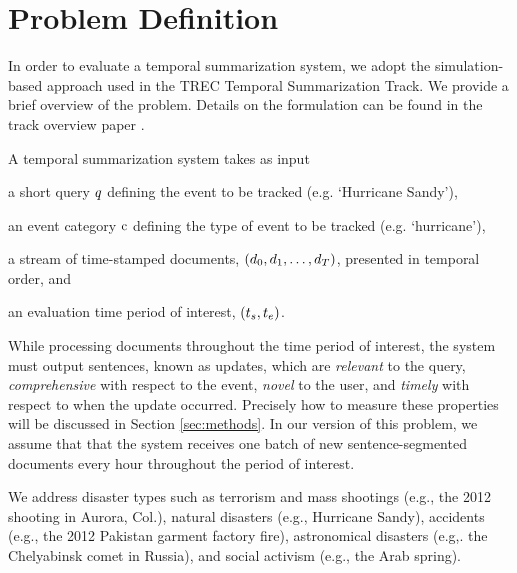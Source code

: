 \section{Problem Definition}
\label{sec:problemdefinition}
In order to evaluate a temporal summarization system, we adopt the simulation-based approach used in the TREC Temporal Summarization Track.  We provide a brief overview of the problem.  Details on the formulation can be found in the track overview paper \cite{aslam2013trec}.  

A temporal summarization system takes as input 
\begin{enumerate*}[label=\itshape\alph*\upshape)]
  \item a short query $q$ defining the event to be tracked (e.g. `Hurricane Sandy'), 
  \item an event category $\operatorname{c}$ defining the type of event to be tracked (e.g. `hurricane'), 
  \item a stream of time-stamped documents, $(\operatorname{\mathnormal{d}}_0, \operatorname{\mathnormal{d}}_1,\ldots,\operatorname{\mathnormal{d}}_T)$, presented in temporal order, and
        \item an evaluation time period of interest, $(t_s,t_e)$.  
\end{enumerate*}
While processing documents throughout the time period of interest, the system
must output sentences, known as updates, which are \emph{relevant} to the
query, \emph{comprehensive} with respect to the event, \emph{novel} to the
user, and \emph{timely} with respect to when the update occurred.  Precisely
how to measure these properties will be discussed in Section \ref{sec:methods}.
In our version of this problem, we assume that that the system receives one
batch of new sentence-segmented documents every hour throughout the period of
interest.

We address  disaster types such as terrorism and mass shootings (e.g.,
the 2012 shooting in Aurora, Col.), natural disasters (e.g., Hurricane Sandy),
accidents (e.g., the 2012 Pakistan garment factory fire), astronomical
disasters (e.g,. the Chelyabinsk comet in Russia), and social activism (e.g.,
the Arab spring).

